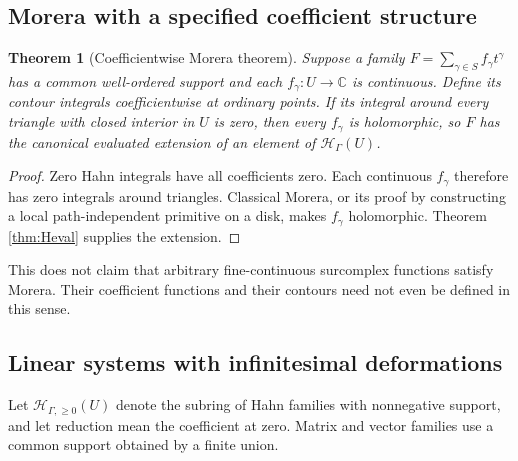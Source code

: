 \documentclass[11pt,a4paper]{article}
\newtheorem{theorem}{Theorem}[section]
\theoremstyle{definition}
\theoremstyle{remark}
\newcommand{\C}{\mathbb C}
\newcommand{\HH}{\mathcal H}
\begin{document}
\subsection{Morera with a specified coefficient structure}
\begin{theorem}[Coefficientwise Morera theorem]\label{thm:morera}
Suppose a family $F=\sum_{\gamma\in S}f_\gamma t^\gamma$ has a
common well-ordered support and each $f_\gamma:U\to\C$ is
continuous. Define its contour integrals coefficientwise at ordinary
points. If its integral around every triangle with closed interior in
$U$ is zero, then every $f_\gamma$ is holomorphic, so $F$ has the
canonical evaluated extension of an element of $\HH_\Gamma(U)$.
\end{theorem}
\begin{proof}
Zero Hahn integrals have all coefficients zero. Each continuous
$f_\gamma$ therefore has zero integrals around triangles. Classical
Morera, or its proof by constructing a local path-independent
primitive on a disk, makes $f_\gamma$ holomorphic. Theorem
\ref{thm:Heval} supplies the extension.
\end{proof}
This does not claim that arbitrary fine-continuous surcomplex
functions satisfy Morera. Their coefficient functions and their
contours need not even be defined in this sense.

\subsection{Linear systems with infinitesimal deformations}
Let $\HH_{\Gamma,\ge0}(U)$ denote the subring of Hahn families with
nonnegative support, and let reduction mean the coefficient at zero.
Matrix and vector families use a common support obtained by a finite
union.
\end{document}
